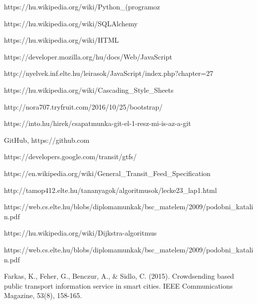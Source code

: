 \begin{thebibliography}{x}

 https://hu.wikipedia.org/wiki/Python\_(programoz%


 https://hu.wikipedia.org/wiki/SQLAlchemy

 https://hu.wikipedia.org/wiki/HTML

 https://developer.mozilla.org/hu/docs/Web/JavaScript

 http://nyelvek.inf.elte.hu/leirasok/JavaScript/index.php?chapter=27

 https://hu.wikipedia.org/wiki/Cascading\_Style\_Sheets

 http://nora707.tryfruit.com/2016/10/25/bootstrap/

 https://into.hu/hirek/csapatmunka-git-el-1-resz-mi-is-az-a-git

 GitHub, https://github.com

https://developers.google.com/transit/gtfs/

https://en.wikipedia.org/wiki/General\_Transit\_Feed\_Specification

http://tamop412.elte.hu/tananyagok/algoritmusok/lecke23\_lap1.html

https://web.cs.elte.hu/blobs/diplomamunkak/bsc\_matelem/2009/podobni\_katalin.pdf

https://hu.wikipedia.org/wiki/Dijkstra-algoritmus

https://web.cs.elte.hu/blobs/diplomamunkak/bsc\_matelem/2009/podobni\_katalin.pdf

Farkas, K., Feher, G., Benczur, A., \& Sidlo, C. (2015). Crowdsending based public transport information service in smart cities. IEEE Communications Magazine, 53(8), 158-165.

\end{thebibliography}
